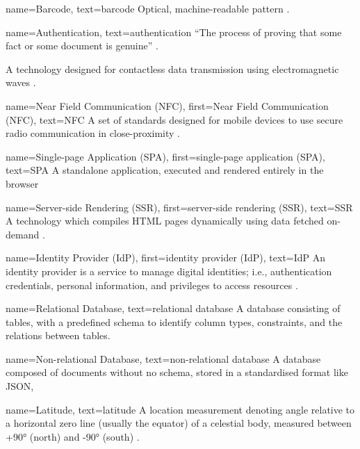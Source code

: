 {
  name={Barcode},
  text={barcode}
}
{
  Optical, machine-readable pattern
  \parencite{whatIsABarcode}.
}

{
  name={Authentication},
  text={authentication}
}
{
  \enquote{The process of proving that some fact or some
    document is genuine} \parencite{whatIsAuth}.
}

{
  A technology designed for contactless data transmission
  using electromagnetic waves \parencite{whatIsRfid}.
}

{
  name={Near Field Communication (NFC)},
  first={Near Field Communication (NFC)},
  text={NFC}
}
{
  A set of standards designed for mobile devices to use
  secure radio communication in close-proximity \cite{nfc}.
}

{
  name={Single-page Application (SPA)},
  first={single-page application (SPA)},
  text={SPA}
}
{
  A standalone application, executed and rendered entirely
  in the browser \parencite{webTechComparison}
}

{
  name={Server-side Rendering (SSR)},
  first={server-side rendering (SSR)},
  text={SSR}
}
{
  A technology which compiles HTML pages dynamically using
  data fetched on-demand \parencite{webTechComparison}.
}

{
  name={Identity Provider (IdP)},
  first={identity provider (IdP)},
  text={IdP}
}
{
  An identity provider is a service to manage digital
  identities; i.e., authentication credentials, personal
  information, and privileges to access resources
  \parencite{identityProviders}.
}

{
  name={Relational Database},
  text={relational database}
}
{
  A database consisting of tables, with a predefined schema
  to identify column types, constraints, and the relations
  between tables.
}

{
  name={Non-relational Database},
  text={non-relational database}
}
{
  A database composed of documents without no schema,
  stored in a standardised format like JSON,
}

{
  name={Latitude},
  text={latitude}
}
{
  A location measurement denoting angle relative to a
  horizontal zero line (usually the equator) of a celestial
  body, measured between +\ang{90} (north) and -\ang{90}
  (south) \parencite{coordSystems}.
}

